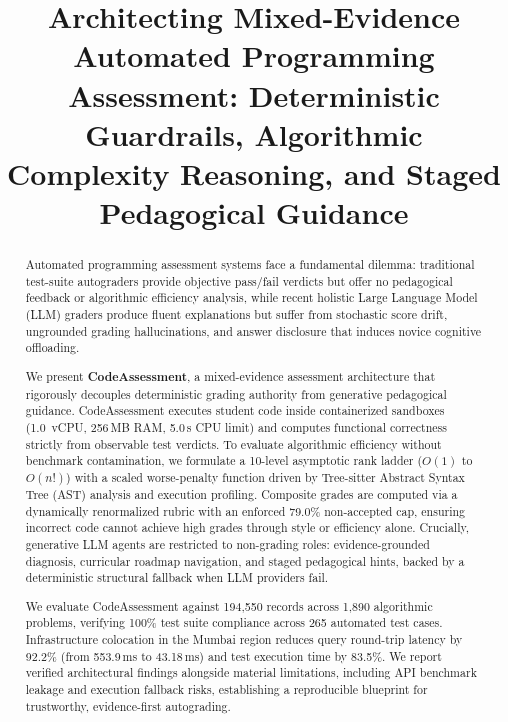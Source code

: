 \documentclass[conference]{IEEEtran}
\begin{document}
\title{Architecting Mixed-Evidence Automated Programming Assessment: Deterministic Guardrails, Algorithmic Complexity Reasoning, and Staged Pedagogical Guidance}

\author{
}

\maketitle

\begin{abstract}
Automated programming assessment systems face a fundamental dilemma: traditional test-suite autograders provide objective pass/fail verdicts but offer no pedagogical feedback or algorithmic efficiency analysis, while recent holistic Large Language Model (LLM) graders produce fluent explanations but suffer from stochastic score drift, ungrounded grading hallucinations, and answer disclosure that induces novice cognitive offloading. 

We present \textbf{CodeAssessment}, a mixed-evidence assessment architecture that rigorously decouples deterministic grading authority from generative pedagogical guidance. CodeAssessment executes student code inside containerized sandboxes (1.0~vCPU, 256\,MB RAM, 5.0\,s CPU limit) and computes functional correctness strictly from observable test verdicts. To evaluate algorithmic efficiency without benchmark contamination, we formulate a 10-level asymptotic rank ladder ($O(1)$ to $O(n!)$) with a scaled worse-penalty function driven by Tree-sitter Abstract Syntax Tree (AST) analysis and execution profiling. Composite grades are computed via a dynamically renormalized rubric with an enforced 79.0\% non-accepted cap, ensuring incorrect code cannot achieve high grades through style or efficiency alone. Crucially, generative LLM agents are restricted to non-grading roles: evidence-grounded diagnosis, curricular roadmap navigation, and staged pedagogical hints, backed by a deterministic structural fallback when LLM providers fail. 

We evaluate CodeAssessment against 194,550 records across 1,890 algorithmic problems, verifying 100\% test suite compliance across 265 automated test cases. Infrastructure colocation in the Mumbai region reduces query round-trip latency by 92.2\% (from 553.9\,ms to 43.18\,ms) and test execution time by 83.5\%. We report verified architectural findings alongside material limitations, including API benchmark leakage and execution fallback risks, establishing a reproducible blueprint for trustworthy, evidence-first autograding.
\end{abstract}
\end{document}

